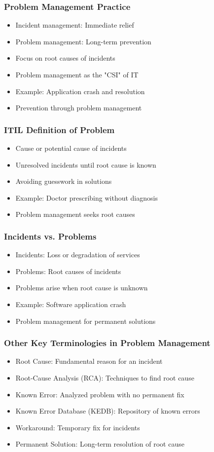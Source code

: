 \documentclass[aspectratio=169, table]{beamer}
\begin{document}
\begin{frame}
	\frametitle{Problem Management Practice}
	\begin{itemize}
		\item Incident management: Immediate relief
		\item Problem management: Long-term prevention
		\item Focus on root causes of incidents
		\item Problem management as the "CSI" of IT
		\item Example: Application crash and resolution
		\item Prevention through problem management
	\end{itemize}
\end{frame}

\begin{frame}
	\frametitle{ITIL Definition of Problem}
	\begin{itemize}
		\item Cause or potential cause of incidents
		\item Unresolved incidents until root cause is known
		\item Avoiding guesswork in solutions
		\item Example: Doctor prescribing without diagnosis
		\item Problem management seeks root causes
	\end{itemize}
\end{frame}

\begin{frame}
	\frametitle{Incidents vs. Problems}
	\begin{itemize}
		\item Incidents: Loss or degradation of services
		\item Problems: Root causes of incidents
		\item Problems arise when root cause is unknown
		\item Example: Software application crash
		\item Problem management for permanent solutions
	\end{itemize}
\end{frame}

\begin{frame}
	\frametitle{Other Key Terminologies in Problem Management}
	\begin{itemize}
		\item Root Cause: Fundamental reason for an incident
		\item Root-Cause Analysis (RCA): Techniques to find root cause
		\item Known Error: Analyzed problem with no permanent fix
		\item Known Error Database (KEDB): Repository of known errors
		\item Workaround: Temporary fix for incidents
		\item Permanent Solution: Long-term resolution of root cause
	\end{itemize}
\end{frame}
\end{document}
